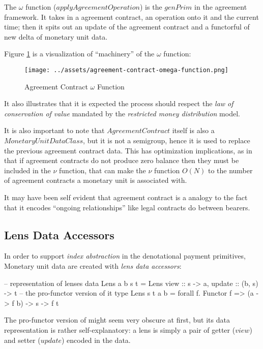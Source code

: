 The $\omega$ function ($applyAgreementOperation$) is the $genPrim$ in the agreement framework. It
takes in a agreement contract, an operation onto it and the current time; then it spits out an
update of the agreement contract and a functorful of new delta of monetary unit data.

Figure \ref{fig:ac-omega} is a visualization of ``machinery'' of the $\omega$ function:

\begin{figure}[h]
    \centering
    \texttt{[image: ../assets/agreement-contract-omega-function.png]}
    \caption{Agreement Contract $\omega$ Function}
    \label{fig:ac-omega}
\end{figure}

It also illustrates that it is expected the process should respect the \textit{law of conservation
of value} mandated by the \textit{restricted money distribution} model.

It is also important to note that $AgreementContract$ itself is also a $MonetaryUnitDataClass$, but
it is not a semigroup, hence it is used to replace the previous agreement contract data. This has
optimization implications, as in that if agreement contracts do not produce zero balance then they
must be included in the $\nu$ function, that can make the $\nu$ function $O(N)$ to the number of
agreement contracts a monetary unit is associated with.

It may have been self evident that agreement contract is a analogy to the fact that it encodes
``ongoing relationships'' like legal contracts do between bearers.

\subsection{Lens Data Accessors}

In order to support \textit{index abstraction} in the denotational payment primitives, Monetary unit
data are created with \textit{lens data accessors}:

\begin{code}
-- representation of lenses
data Lens a b s t = Lens { view :: s -> a, update :: (b, s) -> t }
-- the pro-functor version of it
type Lens s t a b = forall f. Functor f => (a -> f b) -> s -> f t
\end{code}

The pro-functor version of might seem very obscure at first, but its data representation is rather
self-explanatory: a lens is simply a pair of getter ($view$) and setter ($update$) encoded in the
data.

